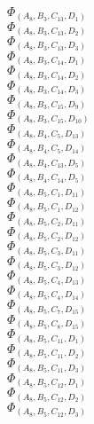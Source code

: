 \documentclass[14pt]{article}
\begin{document}
    $\Phi_{({A}_{8}, {B}_{3}, {C}_{13}, {D}_{1})}$ \\ 
    $\Phi_{({A}_{8}, {B}_{3}, {C}_{13}, {D}_{2})}$ \\ 
    $\Phi_{({A}_{8}, {B}_{3}, {C}_{13}, {D}_{3})}$ \\ 
    $\Phi_{({A}_{8}, {B}_{3}, {C}_{14}, {D}_{1})}$ \\ 
    $\Phi_{({A}_{8}, {B}_{3}, {C}_{14}, {D}_{2})}$ \\ 
    $\Phi_{({A}_{8}, {B}_{3}, {C}_{14}, {D}_{3})}$ \\ 
    $\Phi_{({A}_{8}, {B}_{3}, {C}_{15}, {D}_{9})}$ \\ 
    $\Phi_{({A}_{8}, {B}_{3}, {C}_{15}, {D}_{10})}$ \\ 
    $\Phi_{({A}_{8}, {B}_{4}, {C}_{5}, {D}_{13})}$ \\ 
    $\Phi_{({A}_{8}, {B}_{4}, {C}_{5}, {D}_{14})}$ \\ 
    $\Phi_{({A}_{8}, {B}_{4}, {C}_{13}, {D}_{5})}$ \\ 
    $\Phi_{({A}_{8}, {B}_{4}, {C}_{14}, {D}_{5})}$ \\ 
    $\Phi_{({A}_{8}, {B}_{5}, {C}_{1}, {D}_{11})}$ \\ 
    $\Phi_{({A}_{8}, {B}_{5}, {C}_{1}, {D}_{12})}$ \\ 
    $\Phi_{({A}_{8}, {B}_{5}, {C}_{2}, {D}_{11})}$ \\ 
    $\Phi_{({A}_{8}, {B}_{5}, {C}_{2}, {D}_{12})}$ \\ 
    $\Phi_{({A}_{8}, {B}_{5}, {C}_{3}, {D}_{11})}$ \\ 
    $\Phi_{({A}_{8}, {B}_{5}, {C}_{3}, {D}_{12})}$ \\ 
    $\Phi_{({A}_{8}, {B}_{5}, {C}_{4}, {D}_{13})}$ \\ 
    $\Phi_{({A}_{8}, {B}_{5}, {C}_{4}, {D}_{14})}$ \\ 
    $\Phi_{({A}_{8}, {B}_{5}, {C}_{7}, {D}_{15})}$ \\ 
    $\Phi_{({A}_{8}, {B}_{5}, {C}_{8}, {D}_{15})}$ \\ 
    $\Phi_{({A}_{8}, {B}_{5}, {C}_{11}, {D}_{1})}$ \\ 
    $\Phi_{({A}_{8}, {B}_{5}, {C}_{11}, {D}_{2})}$ \\ 
    $\Phi_{({A}_{8}, {B}_{5}, {C}_{11}, {D}_{3})}$ \\ 
    $\Phi_{({A}_{8}, {B}_{5}, {C}_{12}, {D}_{1})}$ \\ 
    $\Phi_{({A}_{8}, {B}_{5}, {C}_{12}, {D}_{2})}$ \\ 
    $\Phi_{({A}_{8}, {B}_{5}, {C}_{12}, {D}_{3})}$ \\ 
\end{document}
